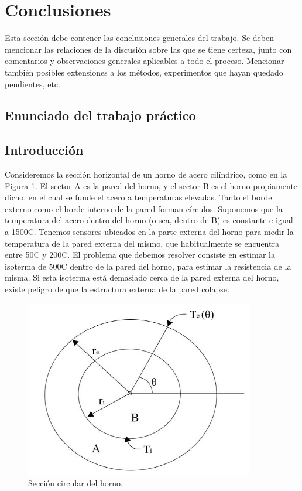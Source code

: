 \documentclass[11pt, a4paper, spanish]{article}
\theoremstyle{plain}
\theoremstyle{remark}
\begin{document}
\section{Conclusiones}

  {\color{Gray} Esta sección debe contener las conclusiones generales del trabajo. Se deben mencionar las relaciones de la discusión sobre las que se tiene certeza, junto con comentarios y observaciones generales aplicables a todo el proceso. Mencionar también posibles extensiones a los métodos, experimentos que hayan quedado pendientes, etc.}

\newpage
\begin{appendices}

  \section{Enunciado del trabajo práctico}

    \subsection{Introducción}

      Consideremos la sección horizontal de un horno de acero cilíndrico, como en la Figura \ref{fig:seccionHorno}. El sector A es la pared del horno, y el sector B es el horno propiamente dicho, en el cual se funde el acero a temperaturas elevadas. Tanto el borde externo como el borde interno de la pared forman círculos. Suponemos que la temperatura del acero dentro del horno (o sea, dentro de B) es constante e igual a 1500{\degree}C.
      Tenemos sensores ubicados en la parte externa del horno para medir la temperatura de la pared externa del mismo, que habitualmente se encuentra entre 50{\degree}C y 200{\degree}C. El problema que debemos resolver consiste en estimar la isoterma de 500{\degree}C dentro de la pared del horno, para estimar la resistencia de la misma. Si esta isoterma está demasiado cerca de la pared externa del horno, existe peligro de que la estructura externa de la pared colapse.

      \begin{figure}[h]
        \centering
        \includegraphics[width=10cm]{seccionHorno.jpg}
        \caption{Sección circular del horno.}
        \label{fig:seccionHorno}
      \end{figure}


\end{appendices}
\end{document}
